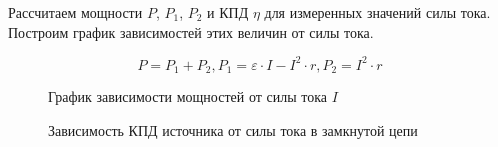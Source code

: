 Рассчитаем мощности $P$, $P_1$, $P_2$ и КПД $\eta$ для измеренных значений силы тока. Построим график зависимостей этих величин от силы тока.

\[
P = P_1+ P_2, P_1 = \varepsilon \cdot I  - I^2\cdot r, P_2 = I^2 \cdot r
\]

\begin{figure}[h]
	\centering
	\caption{График зависимости мощностей от силы тока $I$}
\end{figure}

\begin{figure}[h]
	\centering
	\caption{Зависимость КПД источника от силы тока в замкнутой цепи}
\end{figure}